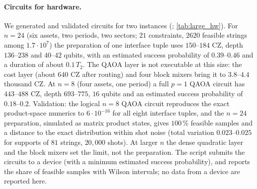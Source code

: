 \paragraph{Circuits for hardware.} We generated and validated circuits for two instances (; \cref{tab:large_hw}). For $n=24$ (six assets, two periods, two sectors; $21$ constraints, $2620$ feasible strings among $1.7\cdot10^7$) the preparation of one interface tuple uses $150$--$184$ CZ, depth $136$--$238$ and $40$--$42$ qubits, with an estimated success probability of $0.39$--$0.46$ and a duration of about $0.1\,T_2$. The QAOA layer is not executable at this size: the cost layer (about $640$ CZ after routing) and four block mixers bring it to $3.8$--$4.4$ thousand CZ. At $n=8$ (four assets, one period) a full $p=1$ QAOA circuit has $443$--$488$ CZ, depth $693$--$775$, $16$ qubits and an estimated success probability of $0.18$--$0.2$. Validation: the logical $n=8$ QAOA circuit reproduces the exact product-space numerics to $6\cdot10^{-16}$ for all eight interface tuples, and the $n=24$ preparation, simulated as matrix product states, gives $100\,\%$ feasible samples and a distance to the exact distribution within shot noise (total variation $0.023$--$0.025$ for supports of $81$ strings, $20{,}000$ shots). At larger $n$ the dense quadratic layer and the block mixers set the limit, not the preparation. The script submits the circuits to a device (with a minimum estimated success probability), and  reports the share of feasible samples with Wilson intervals; no data from a device are reported here.



